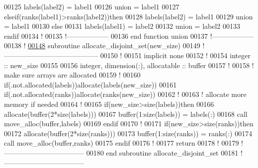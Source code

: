 \begin{DoxyCode}
00125        labels(label2) = label1
00126        union = label1
00127     elseif(ranks(label1)>ranks(label2))\textcolor{keyword}{then}
00128        labels(label2) = label1
00129        union = label1
00130     \textcolor{keyword}{else}
00131        labels(label1) = label2
00132        union = label2
00133     \textcolor{keyword}{endif}
00134     \textcolor{comment}{!}
00135   \textcolor{comment}{!------------------}
00136 \textcolor{keyword}{  end function  union}
00137   \textcolor{comment}{!------------------}
00138   \textcolor{comment}{!}
\hypertarget{module__disjoint__set_8f90_source_l00148}{}\hyperlink{classmodule__disjoint__set_aa43d8eb044efd1e8db88393da2ebb954}{00148}   \textcolor{keyword}{subroutine }allocate\_disjoint\_set(new\_size)
00149   \textcolor{comment}{!-----------------------------------------}
00150     \textcolor{comment}{!}
00151     \textcolor{keyword}{implicit none}
00152     \textcolor{comment}{!}
00154     \textcolor{keywordtype}{integer} :: new\_size
00155 
00156     \textcolor{keywordtype}{integer}, \textcolor{keywordtype}{dimension(:)}, \textcolor{keywordtype}{allocatable} :: buffer
00157     \textcolor{comment}{!}
00158     \textcolor{comment}{! make sure arrays are allocated}
00159     \textcolor{comment}{!}
00160     \textcolor{keyword}{if}(.not.\textcolor{keyword}{allocated}(labels))\textcolor{keyword}{allocate}(labels(new\_size))
00161     \textcolor{keyword}{if}(.not.\textcolor{keyword}{allocated}(ranks))\textcolor{keyword}{allocate}(ranks(new\_size))
00162     \textcolor{comment}{!}
00163     \textcolor{comment}{! allocate more memory if needed}
00164     \textcolor{comment}{! }
00165     \textcolor{keyword}{if}(new\_size>\textcolor{keyword}{size}(labels))\textcolor{keyword}{then}
00166        \textcolor{keyword}{allocate}(buffer(2*\textcolor{keyword}{size}(labels)))
00167        buffer(1:\textcolor{keyword}{size}(labels)) = labels(:)
00168        call move\_alloc(buffer,labels)
00169     \textcolor{keyword}{endif}
00170     \textcolor{comment}{! }
00171     \textcolor{keyword}{if}(new\_size>\textcolor{keyword}{size}(ranks))\textcolor{keyword}{then}
00172        \textcolor{keyword}{allocate}(buffer(2*\textcolor{keyword}{size}(ranks)))
00173        buffer(1:\textcolor{keyword}{size}(ranks)) = ranks(:)
00174        call move\_alloc(buffer,ranks)
00175     \textcolor{keyword}{endif}
00176     \textcolor{comment}{!}
00177     return
00178     \textcolor{comment}{!}
00179   \textcolor{comment}{!-----------------------------------}
00180 \textcolor{keyword}{  end subroutine allocate\_disjoint\_set}
00181   \textcolor{comment}{!-----------------------------------}

\end{DoxyCode}
